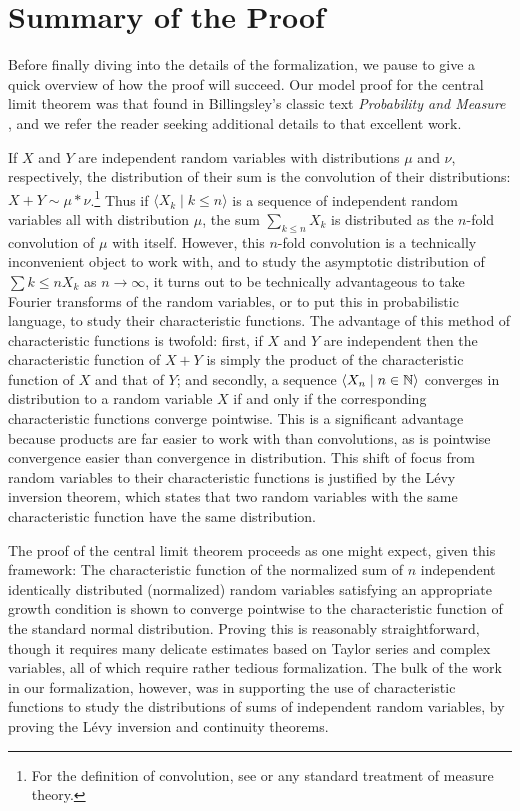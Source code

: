 \documentclass{article}
\theoremstyle{definition}
\newcommand{\bldseq}[2]{\langle{#1}\mid{#2}\rangle}
\begin{document}
\section{Summary of the Proof}

Before finally diving into the details of the formalization, we pause to give a quick overview of how the proof will succeed. Our model proof for the central limit theorem was that found in Billingsley's classic text {\em Probability and Measure} \cite{billingsley}, and we refer the reader seeking additional details to that excellent work.

If $X$ and $Y$ are independent random variables with distributions $\mu$ and $\nu$, respectively, the distribution of their sum is the convolution of their distributions: $X + Y \sim \mu * \nu$.\footnote{For the definition of convolution, see \cite{billingsley} or any standard treatment of measure theory.} Thus if $\bldseq{X_k}{k \le n}$ is a sequence of independent random variables all with distribution $\mu$, the sum $\sum_{k \le n} X_k$ is distributed as the $n$-fold convolution of $\mu$ with itself. However, this $n$-fold convolution is a technically inconvenient object to work with, and to study the asymptotic distribution of $\sum{k \le n} X_k$ as $n \rightarrow \infty$, it turns out to be technically advantageous to take Fourier transforms of the random variables, or to put this in probabilistic language, to study their characteristic functions. The advantage of this method of characteristic functions is twofold: first, if $X$ and $Y$ are independent then the characteristic function of $X + Y$ is simply the product of the characteristic function of $X$ and that of $Y$; and secondly, a sequence $\bldseq{X_n}{n \in \N}$ converges in distribution to a random variable $X$ if and only if the corresponding characteristic functions converge pointwise. This is a significant advantage because products are far easier to work with than convolutions, as is pointwise convergence easier than convergence in distribution. This shift of focus from random variables to their characteristic functions is justified by the L\'evy inversion theorem, which states that two random variables with the same characteristic function have the same distribution.

The proof of the central limit theorem proceeds as one might expect, given this framework: The characteristic function of the normalized sum of $n$ independent identically distributed (normalized) random variables satisfying an appropriate growth condition is shown to converge pointwise to the characteristic function of the standard normal distribution. Proving this is reasonably straightforward, though it requires many delicate estimates based on Taylor series and complex variables, all of which require rather tedious formalization. The bulk of the work in our formalization, however, was in supporting the use of characteristic functions to study the distributions of sums of independent random variables, by proving the L\'evy inversion and continuity theorems.
\end{document}
